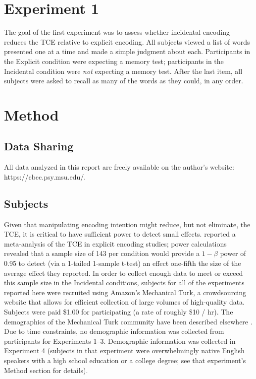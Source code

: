 \documentclass[man,natbib,floatsintext]{apa6} %
\begin{document}
\section{Experiment 1}
The goal of the first experiment was to assess whether incidental encoding reduces the TCE relative to explicit encoding. All subjects viewed a list of words presented one at a time and made a simple judgment about each. Participants in the Explicit condition were expecting a memory test; participants in the Incidental condition were \emph{not} expecting a memory test.  After the last item, all subjects were asked to recall as many of the words as they could, in any order. 

\section{Method}

\newcommand\listlength{16} %
\newcommand\presrate{4 seconds} %
\newcommand\isi{1 second} %
\newcommand\DFRDelay{16 second} %
\newcommand\recalltime{75 seconds} %

\subsection{Data Sharing}All data analyzed in this report are freely available on the author's website: https://cbcc.psy.msu.edu/.

\subsection{Subjects}
Given that manipulating encoding intention might reduce, but not eliminate, the TCE, it is critical to have sufficient power to detect small effects. \citet{SedeEtal10} reported a meta-analysis of the TCE in explicit encoding studies; power calculations revealed that a sample size of 143 per condition would provide a $1-\beta$ power of 0.95 to detect (via a 1-tailed 1-sample t-test) an effect one-fifth the size of the average effect they reported. In order to collect enough data to meet or exceed this sample size in the Incidental conditions, subjects for all of the experiments reported here were recruited using Amazon's Mechanical Turk, a crowdsourcing website that allows for efficient collection of large volumes of high-quality data. Subjects were paid \$1.00 for participating (a rate of roughly \$10 / hr). The demographics of the Mechanical Turk community have been described elsewhere \cite[approximately 55\% female with a mean age of 32;][]{MasoSuri12}. Due to time constraints, no demographic information was collected from participants for Experiments 1--3. Demographic information was collected in Experiment 4 (subjects in that experiment were overwhelmingly native English speakers with a high school education or a college degree; see that experiment's Method section for details). 
\end{document}
